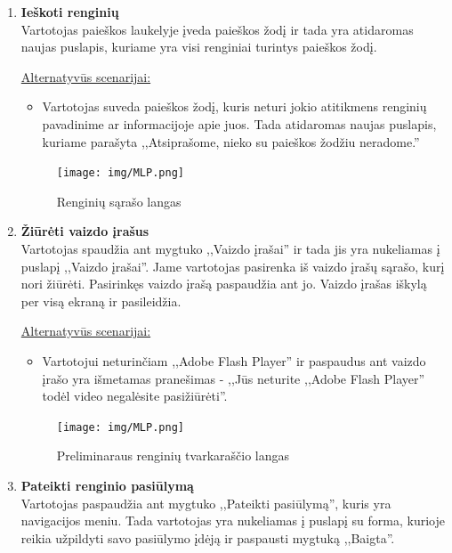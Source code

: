 \documentclass{VUMIFPSkursinis}
\begin{document}
\begin{enumerate} [label = \textbf{U\arabic*.}]
				\begin{figure}[H]
						\centering
						\texttt{[image: img/MLP.png]}
						\caption{Prisijungimo langas}
						\label{fig:prisijungimo-langas}
					\end{figure}

			\item \textbf{Ieškoti renginių} \\
					Vartotojas paieškos laukelyje įveda paieškos žodį ir tada yra atidaromas naujas puslapis, kuriame yra visi renginiai turintys paieškos žodį.
					
				\underline{Alternatyvūs scenarijai:}
				\begin{itemize}
						\item Vartotojas suveda paieškos žodį, kuris neturi jokio atitikmens renginių pavadinime ar informacijoje apie juos. Tada atidaromas naujas puslapis, kuriame parašyta ,,Atsiprašome, nieko su paieškos žodžiu neradome.'' 
				\end{itemize}

				\begin{figure}[H]
					\centering
					\texttt{[image: img/MLP.png]}
					\caption{Renginių sąrašo langas}
					\label{fig:uzd_perziureti-vyksianciu-renginiu-sarasa}
				\end{figure}
				
			\item \textbf{Žiūrėti vaizdo įrašus} \\
				Vartotojas spaudžia ant mygtuko ,,Vaizdo įrašai'' ir tada jis yra nukeliamas į puslapį ,,Vaizdo įrašai''. Jame vartotojas pasirenka iš vaizdo įrašų sąrašo, kurį nori žiūrėti. Pasirinkęs vaizdo įrašą paspaudžia ant jo. Vaizdo įrašas iškylą per visą ekraną ir pasileidžia.
				
				\underline{Alternatyvūs scenarijai:}
				\begin{itemize}
					\item Vartotojui neturinčiam ,,Adobe Flash Player'' ir paspaudus ant vaizdo įrašo yra išmetamas pranešimas - ,,Jūs neturite ,,Adobe Flash Player'' todėl video negalėsite pasižiūrėti''.
				\end{itemize}

				\begin{figure}[H]
					\centering
					\texttt{[image: img/MLP.png]}
					\caption{Preliminaraus renginių tvarkaraščio langas}
					\label{fig:prelim-tvark-langas}
				\end{figure}
				
			\item \textbf{Pateikti renginio pasiūlymą} \\
					Vartotojas paspaudžia ant mygtuko ,,Pateikti pasiūlymą'', kuris yra navigacijos meniu. Tada vartotojas yra nukeliamas į puslapį su forma, kurioje reikia užpildyti savo pasiūlymo įdėją ir paspausti mygtuką ,,Baigta''.
							

\end{enumerate}
\end{document}
